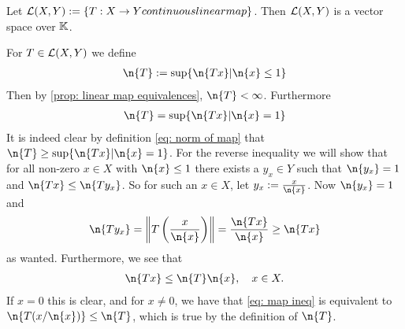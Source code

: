 \documentclass[../../main.tex]{subfiles}
\begin{document}
Let $\mathcal{L}(X,Y):=\{ T : X \to Y continuous linear map \}$. Then $\mathcal{L}(X,Y)$ is a vector space over $\mathbb{K}$.
\begin{remark}
For $T\in \mathcal{L}(X, Y)$ we define
\begin{align}
	\n{T}:=\sup \{ \n{Tx} | \n{x} \le 1 \} \label{eq: norm of map}
\end{align}
Then by \cref{prop: linear map equivalences}, $\n{T}<\infty$. Furthermore
\begin{align*}
	\n{T} = \sup \{ \n{Tx} | \n{x} = 1 \}
\end{align*}
It is indeed clear by definition \eqref{eq: norm of map} that $\n{T}\ge \sup \{ \n{Tx} | \n{x} = 1 \}$. For the reverse inequality we will show that for all non-zero $x\in X$ with $\n{x}\le1$ there exists a $y_{x}\in Y$ such that $\n{y_{x}}=1$ and $\n{Tx}\le \n{Ty_{x}}$. So for such an $x\in X$, let $y_{x}:=\frac{x}{\n{x}}$. Now $\n{y_{x}}=1$ and 
\begin{align*}
	\n{Ty_{x}} = \left\Vert T\left(\frac{x}{\n{x}}\right) \right\Vert=\frac{\n{Tx}}{\n{x}}\ge \n{Tx}
\end{align*}
as wanted. Furthermore, we see that
\begin{align}
	\n{Tx} \le \n{T}\n{x}, \quad x\in X. \label{eq: map ineq}
\end{align}
If $x=0$ this is clear, and for $x\neq 0$, we have that \eqref{eq: map ineq} is equivalent to $\n{T(x/\n{x})}\le \n{T}$, which is true by the definition of $\n{T}$.
\end{remark}
\end{document}

